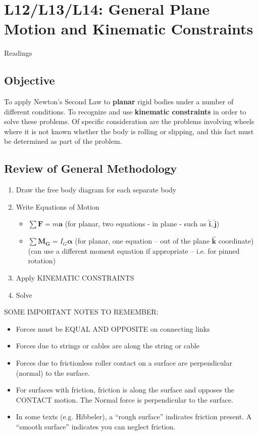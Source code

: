 \documentclass[12pt,letterpaper,twoside]{report}
\begin{document}
\vspace*{10\baselineskip}

\chapter{L12/L13/L14: General Plane Motion and Kinematic Constraints}
Readings

\section{Objective}
To apply Newton’s Second Law to \textbf{planar} rigid bodies under a number of different conditions.  To recognize and use \textbf{kinematic constraints} in order to solve these problems.  Of specific consideration are the problems involving wheels where it is not known whether the body is rolling or slipping, and this fact must be determined as part of the problem.  

\section{Review of General Methodology}
\begin{enumerate}
\item Draw the free body diagram for each separate body
\item  Write Equations of Motion 
\begin{itemize}
\item $\displaystyle \sum \bm{F} = m \bm{a}$ (for planar, two equations - in plane - such as $\bm{\hat{i}}, \bm{\hat{j}}$)
\item $\displaystyle \sum \bm{M_G} = I_G \bm{\alpha}$ (for planar, one equation – out of the plane $\bm{\hat{k}}$ coordinate) \\
(can use a different moment equation if appropriate – i.e. for pinned rotation)
\end{itemize}
\item Apply KINEMATIC CONSTRAINTS
\item Solve
\end{enumerate}

SOME IMPORTANT NOTES TO REMEMBER:  
\begin{itemize}
\item Forces must be EQUAL AND OPPOSITE on connecting links
\item Forces due to strings or cables are along the string or cable
\item Forces due to frictionless roller contact on a surface are perpendicular (normal) to the surface.
\item For surfaces with friction, friction is along the surface and opposes the CONTACT motion.  The Normal force is perpendicular to the surface.
\item In some texts (e.g. Hibbeler), a “rough surface” indicates friction present.  A “smooth surface” indicates you can neglect friction.
\end{itemize}
\end{document}
